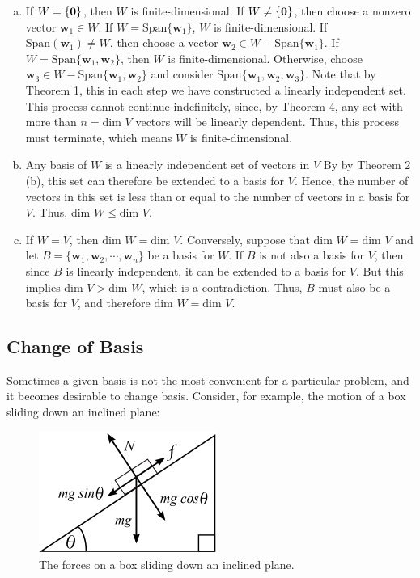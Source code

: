 \documentclass[12pt,letterpaper,reqno]{article}
\numberwithin{equation}{section}
\newcommand{\bw}{\mathbf{w}}
\begin{document}
\begin{pf}
	\begin{enumerate}[(a)]
		\item If $W=\{{\bf 0}\}$, then $W$ is finite-dimensional. If $W \neq \{{\bf 0}\}$, then choose a nonzero vector $\bw_1 \in W$. If $W=\text{Span}\{\bw_1\}$, $W$ is finite-dimensional. If $\text{Span}(\bw_1) \neq W$, then choose a vector $\bw_2 \in W-\text{Span}\{\bw_1\}$. If $W=\text{Span}\{\bw_1,\bw_2\}$, then $W$ is finite-dimensional. Otherwise, choose $\bw_3 \in W-\text{Span}\{\bw_1,\bw_2\}$ and consider $\text{Span}\{\bw_1,\bw_2, \bw_3\}$. Note that by Theorem 1, this in each step we have constructed a linearly independent set. This process cannot continue indefinitely, since, by Theorem 4, any set with more than $n=\text{dim }V$ vectors will be linearly dependent. Thus, this process must terminate, which means $W$ is finite-dimensional.
		\item Any basis of $W$ is a linearly independent set of vectors in $V$ By by Theorem 2 (b), this set can therefore be extended to a basis for $V$. Hence, the number of vectors in this set is less than or equal to the number of vectors in a basis for $V$. Thus, $\text{dim } W \leq \text{dim }V$.
		\item If $W=V$, then $\text{dim }W=\text{dim }V$. Conversely, suppose that $\text{dim } W = \text{dim }V$ and let $B=\{\bw_1,\bw_2,\cdots,\bw_n \}$ be a basis for $W$. If $B$ is not also a basis for $V$, then since $B$ is linearly independent, it can be extended to a basis for $V$. But this implies $\text{dim }V > \text{dim }W$, which is a contradiction. Thus, $B$ must also be a basis for $V$, and therefore $\text{dim }W=\text{dim }V$.
	\end{enumerate}
\end{pf}

\subsection{Change of Basis}
Sometimes a given basis is not the most convenient for a particular problem, and it becomes desirable to change basis. Consider, for example, the motion of a box sliding down an inclined plane:
\begin{figure}[h]
	\begin{center}
		\includegraphics[scale=0.5]{figures_mvc/inclined_plane}
	\end{center}
	\caption{The forces on a box sliding down an inclined plane.}
\end{figure}
\end{document}
